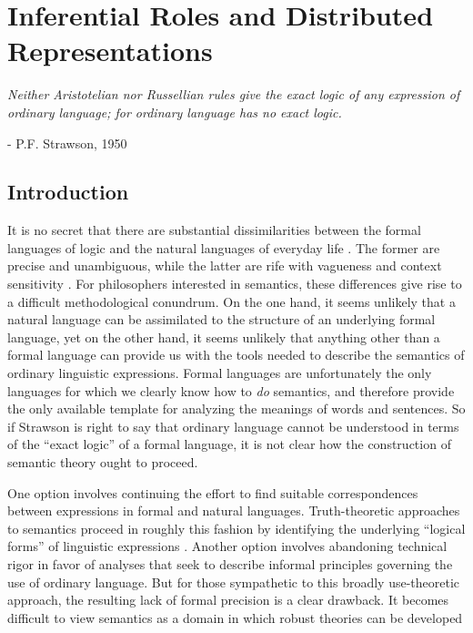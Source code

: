 
\chapter{Inferential Roles and Distributed Representations}
\renewcommand{\epigraphrule}{0pt}
\setlength{\epigraphwidth}{4.5in}
\epigraph{\textit{Neither Aristotelian nor Russellian rules give the exact logic of any expression of ordinary language; for ordinary language has no exact logic.}}{- P.F. Strawson, 1950}

\section{Introduction}

It is no secret that there are substantial dissimilarities between the formal languages of logic and the natural languages of everyday life \citep{Stanley:2008,Recanati:2012}. The former are precise and unambiguous, while the latter are rife with vagueness and context sensitivity \citep{Recanati:2012}. For philosophers interested in semantics, these differences give rise to a difficult methodological conundrum. On the one hand, it seems unlikely that a natural language can be assimilated to the structure of an underlying formal language, yet on the other hand, it seems unlikely that anything other than a formal language can provide us with the tools needed to describe the semantics of ordinary linguistic expressions. Formal languages are unfortunately the only languages for which we clearly know how to \textit{do}  semantics, and therefore provide the only available template for analyzing the meanings of words and sentences. So if Strawson is right to say that ordinary language cannot be understood in terms of the ``exact logic'' of a formal language, it is not clear how the construction of semantic theory ought to proceed. 

One option involves continuing the effort to find suitable correspondences between expressions in formal and natural languages. Truth-theoretic approaches to semantics proceed in roughly this fashion by identifying the underlying ``logical forms'' of linguistic expressions \citep{Soames:2010,Stanley:2008,Speaks:2014,Carpenter:1997}. Another option involves abandoning technical rigor in favor of analyses that seek to describe informal principles governing the use of ordinary language. But for those sympathetic to this broadly use-theoretic approach, the resulting lack of formal precision is a clear drawback. It becomes difficult to view semantics as a domain in which robust theories can be developed \citep[see][]{Wittgenstein:1953} 

